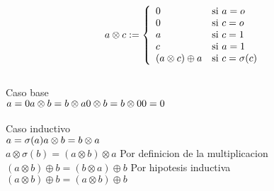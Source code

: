 \documentclass{article}
\begin{document}
\begin{itemize}
\[
a\otimes c := \left\{
 \begin{array}{l l}
            0 & \mbox{si } a=o \\
            0 & \mbox{si } c=o \\
            a & \mbox{si } c=1 \\
            c & \mbox{si } a=1 \\
           (a \otimes c)\oplus a & \mbox{si } c=\sigma(c)\\
        \end{array}
        \right.
\]\\
        Caso base\\
        \begin{math}
        a=0\\
        a\otimes b = b\otimes a\\
        0\otimes b = b\otimes 0\\
        0  =  0\\
        \end{math}\\
        \\
        Caso inductivo \\
        \begin{math}
        a=\sigma(a)\\
        a\otimes b = b\otimes a\\
        \end{math}\\
       {$a\otimes \sigma(b)  = (a\otimes b) \otimes a$} Por definicion de la multiplicacion \\
        {$(a\otimes b)\oplus b = (b\otimes a) \oplus b$} Por hipotesis inductiva \\
        {$(a\otimes b)\oplus b = (a\otimes b) \oplus b$} \\
   
        
        

\end{itemize}
\end{document}
